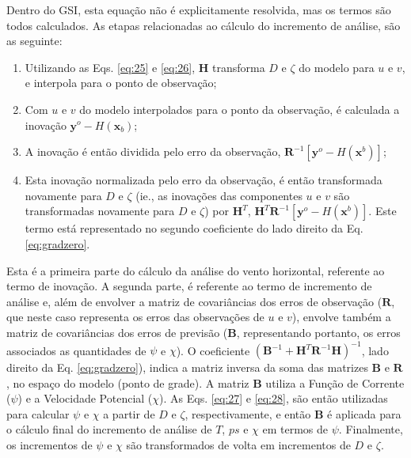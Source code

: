 Dentro do GSI, esta equação não é explicitamente resolvida, mas os termos são todos calculados. As etapas relacionadas ao cálculo do incremento de análise, são as seguinte:


\begin{enumerate}
    \item Utilizando as Eqs. \ref{eq:25} e \ref{eq:26}, $\mathbf{H}$ transforma $D$ e $\zeta$ do modelo para $u$ e $v$, e interpola para o ponto de observação;
    \item Com $u$ e $v$ do modelo interpolados para o ponto da observação, é calculada a inovação $\mathbf{y}^{o}-\textit{H}(\mathbf{x}_{b})$;
    \item A inovação é então dividida pelo erro da observação, $\mathbf{R}^{-1}[{\mathbf{y}^{o}-\textit{H}(\mathbf{x}^{b})}]$;
    \item Esta inovação normalizada pelo erro da observação, é então transformada novamente para $D$ e $\zeta$ (ie., as inovações das componentes $u$ e $v$ são transformadas novamente para $D$ e $\zeta$)  por $\mathbf{H}^{T}$, $\mathbf{H}^{T}{\mathbf{R}^{-1}}[{\mathbf{y}^{o}-\textit{H}(\mathbf{x}^{b})}]$. Este termo está representado no segundo coeficiente do lado direito da Eq. \ref{eq:gradzero}.
\end{enumerate}

Esta é a primeira parte do cálculo da análise do vento horizontal, referente ao termo de inovação. A segunda parte, é referente ao termo de incremento de análise e, além de envolver a matriz de covariâncias dos erros de observação ($\mathbf{R}$, que neste caso representa os erros das observações de $u$ e $v$), envolve também a matriz de covariâncias dos erros de previsão ($\mathbf{B}$, representando portanto, os erros associados as quantidades de $\psi$ e $\chi$). O coeficiente $(\mathbf{B}^{-1} + \mathbf{H}^{T}\mathbf{R}^{-1}\mathbf{H})^{-1}$, lado direito da Eq. \ref{eq:gradzero}), indica a matriz inversa da soma das matrizes $\mathbf{B}$ e $\mathbf{R}$, no espaço do modelo (ponto de grade). A matriz $\mathbf{B}$ utiliza a Função de Corrente ($\psi$) e a Velocidade Potencial ($\chi$). As Eqs. \ref{eq:27} e \ref{eq:28}, são então utilizadas para calcular $\psi$ e $\chi$ a partir de $D$ e $\zeta$, respectivamente, e então $\mathbf{B}$ é aplicada para o cálculo final do incremento de análise de $T$, $ps$ e $\chi$ em termos de $\psi$. Finalmente, os incrementos de $\psi$ e $\chi$ são transformados de volta em incrementos de $D$ e $\zeta$.


